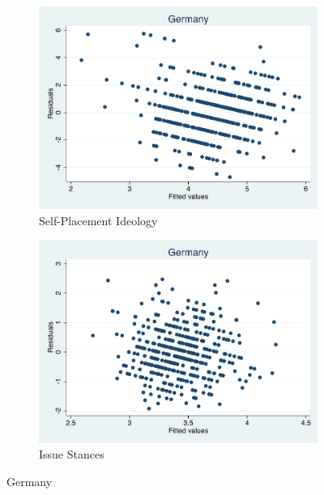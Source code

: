 \documentclass[12pt, titlepage]{article}
\begin{document}
\begin{figure}[H]
	\centering
	\begin{subfigure}[b]{0.475\textwidth}   
		\centering 
		\includegraphics[width=\textwidth]{Residuals/CountryIdeo/Germany}
		\caption{Self-Placement Ideology}
	\end{subfigure}
	\hfill
	\begin{subfigure}[b]{0.475\textwidth}
		\centering 
		\includegraphics[width=\textwidth]{Residuals/CountryLib/Germany}
		\caption{Issue Stances}
	\end{subfigure}
	\caption{Germany}
	\label{Germany}
\end{figure}
\end{document}
